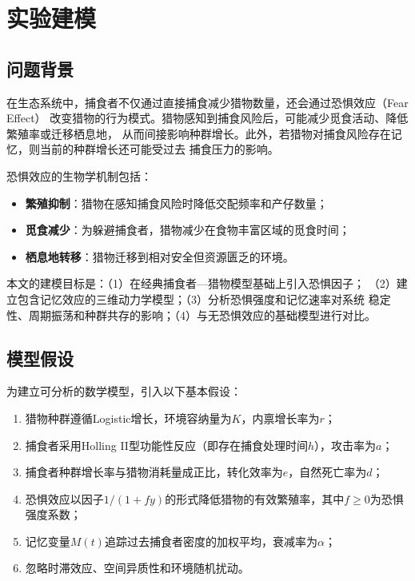 \documentclass[UTF8]{ctexart}
\begin{document}
\section{实验建模}

\subsection{问题背景}

在生态系统中，捕食者不仅通过直接捕食减少猎物数量，还会通过恐惧效应（Fear Effect）
改变猎物的行为模式。猎物感知到捕食风险后，可能减少觅食活动、降低繁殖率或迁移栖息地，
从而间接影响种群增长。此外，若猎物对捕食风险存在记忆，则当前的种群增长还可能受过去
捕食压力的影响。

恐惧效应的生物学机制包括：
\begin{itemize}
    \item \textbf{繁殖抑制}：猎物在感知捕食风险时降低交配频率和产仔数量；
    \item \textbf{觅食减少}：为躲避捕食者，猎物减少在食物丰富区域的觅食时间；
    \item \textbf{栖息地转移}：猎物迁移到相对安全但资源匮乏的环境。
\end{itemize}

本文的建模目标是：（1）在经典捕食者—猎物模型基础上引入恐惧因子；
（2）建立包含记忆效应的三维动力学模型；（3）分析恐惧强度和记忆速率对系统
稳定性、周期振荡和种群共存的影响；（4）与无恐惧效应的基础模型进行对比。

\subsection{模型假设}

为建立可分析的数学模型，引入以下基本假设：

\begin{enumerate}[label=\textbf{假设 \arabic*}, leftmargin=*]
    \item 猎物种群遵循Logistic增长，环境容纳量为$K$，内禀增长率为$r$；
    \item 捕食者采用Holling II型功能性反应（即存在捕食处理时间$h$），攻击率为$a$；
    \item 捕食者种群增长率与猎物消耗量成正比，转化效率为$e$，自然死亡率为$d$；
    \item 恐惧效应以因子$1/(1+fy)$的形式降低猎物的有效繁殖率，其中$f \geq 0$为恐惧强度系数；
    \item 记忆变量$M(t)$追踪过去捕食者密度的加权平均，衰减率为$\alpha$；
    \item 忽略时滞效应、空间异质性和环境随机扰动。
\end{enumerate}
\end{document}
